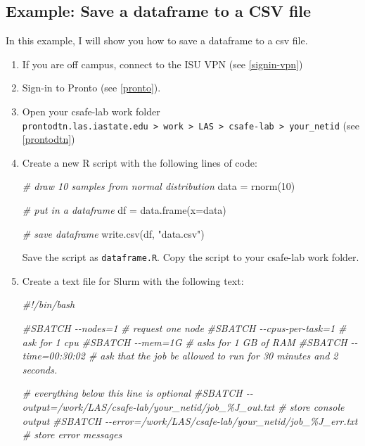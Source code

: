 \documentclass[
]{book}
\newenvironment{Shaded}{\begin{snugshade}}{\end{snugshade}}
\newcommand{\AttributeTok}[1]{\textcolor[rgb]{0.77,0.63,0.00}{#1}}
\newcommand{\CommentTok}[1]{\textcolor[rgb]{0.56,0.35,0.01}{\textit{#1}}}
\newcommand{\DecValTok}[1]{\textcolor[rgb]{0.00,0.00,0.81}{#1}}
\newcommand{\FunctionTok}[1]{\textcolor[rgb]{0.00,0.00,0.00}{#1}}
\newcommand{\NormalTok}[1]{#1}
\newcommand{\OtherTok}[1]{\textcolor[rgb]{0.56,0.35,0.01}{#1}}
\newcommand{\StringTok}[1]{\textcolor[rgb]{0.31,0.60,0.02}{#1}}
\begin{document}
\hypertarget{ex-save}{%
\subsection{Example: Save a dataframe to a CSV file}\label{ex-save}}

In this example, I will show you how to save a dataframe to a csv file.

\begin{enumerate}
\def\labelenumi{\arabic{enumi}.}
\item
  If you are off campus, connect to the ISU VPN (see \ref{signin-vpn})
\item
  Sign-in to Pronto (see \ref{pronto}).
\item
  Open your csafe-lab work folder \texttt{prontodtn.las.iastate.edu\ \textgreater{}\ work\ \textgreater{}\ LAS\ \textgreater{}\ csafe-lab\ \textgreater{}\ your\_netid} (see \ref{prontodtn})
\item
  Create a new R script with the following lines of code:

\begin{Shaded}
\begin{Highlighting}[]
\CommentTok{\# draw 10 samples from normal distribution}
\NormalTok{data }\OtherTok{=} \FunctionTok{rnorm}\NormalTok{(}\DecValTok{10}\NormalTok{)}

\CommentTok{\# put in a dataframe}
\NormalTok{df }\OtherTok{=} \FunctionTok{data.frame}\NormalTok{(}\AttributeTok{x=}\NormalTok{data)}

\CommentTok{\# save dataframe}
\FunctionTok{write.csv}\NormalTok{(df, }\StringTok{"data.csv"}\NormalTok{)}
\end{Highlighting}
\end{Shaded}

  Save the script as \texttt{dataframe.R}. Copy the script to your csafe-lab work folder.
\item
  Create a text file for Slurm with the following text:

\begin{Shaded}
\begin{Highlighting}[]
\CommentTok{\#!/bin/bash}

\CommentTok{\#SBATCH {-}{-}nodes=1 \# request one node}
\CommentTok{\#SBATCH {-}{-}cpus{-}per{-}task=1  \# ask for 1 cpu}
\CommentTok{\#SBATCH {-}{-}mem=1G \#  asks for 1 GB of RAM}
\CommentTok{\#SBATCH {-}{-}time=00:30:02 \# ask that the job be allowed to run for 30 minutes and 2 seconds.}

\CommentTok{\# everything below this line is optional}
\CommentTok{\#SBATCH {-}{-}output=/work/LAS/csafe{-}lab/your\_netid/job\_\%J\_out.txt \# store console output}
\CommentTok{\#SBATCH {-}{-}error=/work/LAS/csafe{-}lab/your\_netid/job\_\%J\_err.txt \# store error messages}


\end{Highlighting}
\end{Shaded}
\end{enumerate}
\end{document}
